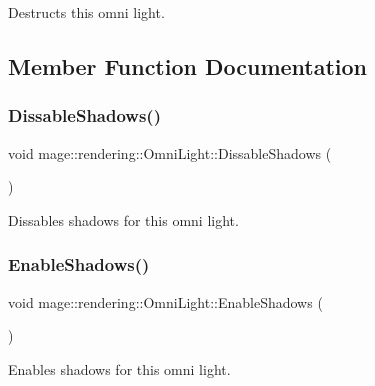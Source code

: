 Destructs this omni light. 

\subsection{Member Function Documentation}
\hypertarget{classmage_1_1rendering_1_1_omni_light_a18eaf3b2683997854827b12ec26c9039}{}\label{classmage_1_1rendering_1_1_omni_light_a18eaf3b2683997854827b12ec26c9039} 
\subsubsection{\texorpdfstring{Dissable\+Shadows()}{DissableShadows()}}
{\footnotesize\ttfamily void mage\+::rendering\+::\+Omni\+Light\+::\+Dissable\+Shadows (\begin{DoxyParamCaption}{ }\end{DoxyParamCaption})\hspace{0.3cm}{\ttfamily [noexcept]}}

Dissables shadows for this omni light. \hypertarget{classmage_1_1rendering_1_1_omni_light_a676a457b4e79b7dc74696acc713a9230}{}\label{classmage_1_1rendering_1_1_omni_light_a676a457b4e79b7dc74696acc713a9230} 
\subsubsection{\texorpdfstring{Enable\+Shadows()}{EnableShadows()}}
{\footnotesize\ttfamily void mage\+::rendering\+::\+Omni\+Light\+::\+Enable\+Shadows (\begin{DoxyParamCaption}{ }\end{DoxyParamCaption})\hspace{0.3cm}{\ttfamily [noexcept]}}

Enables shadows for this omni light. \hypertarget{classmage_1_1rendering_1_1_omni_light_aa3408de0d62c39d09e0b5aaccf61406a}{}\label{classmage_1_1rendering_1_1_omni_light_aa3408de0d62c39d09e0b5aaccf61406a} 
